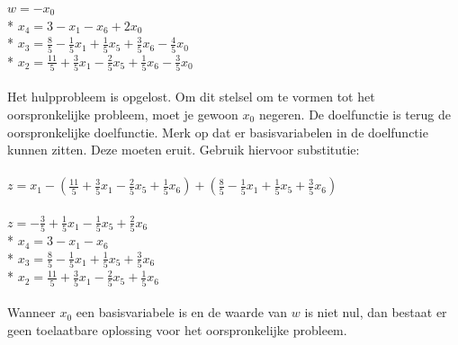 \documentclass[10pt]{article}
\begin{document}
$w = -x_0$\\*
$x_4 = 3 - x_1 - x_6 + 2x_0$\\*
$x_3 = \frac{8}{5} - \frac{1}{5}x_1 + \frac{1}{5}x_5 + \frac{3}{5}x_6 - \frac{4}{5}x_0$\\*
$x_2 = \frac{11}{5} + \frac{3}{5}x_1 - \frac{2}{5}x_5 + \frac{1}{5}x_6 - \frac{3}{5}x_0$\\\\
Het hulpprobleem is opgelost. Om dit stelsel om te vormen tot het oorspronkelijke probleem, moet je gewoon $x_0$ negeren. De doelfunctie is terug de oorspronkelijke doelfunctie. Merk op dat er basisvariabelen in de doelfunctie kunnen zitten. Deze moeten eruit. Gebruik hiervoor substitutie:\\\\
$z = x_1 - (\frac{11}{5} + \frac{3}{5}x_1 - \frac{2}{5}x_5 + \frac{1}{5}x_6) + (\frac{8}{5} - \frac{1}{5}x_1 + \frac{1}{5}x_5 + \frac{3}{5}x_6)$\\\\
$z = -\frac{3}{5} + \frac{1}{5}x_1 - \frac{1}{5}x_5 + \frac{2}{5}x_6$\\*
$x_4 = 3 - x_1 - x_6$\\*
$x_3 = \frac{8}{5} - \frac{1}{5}x_1 + \frac{1}{5}x_5 + \frac{3}{5}x_6$\\*
$x_2 = \frac{11}{5} + \frac{3}{5}x_1 - \frac{2}{5}x_5 + \frac{1}{5}x_6$\\\\
Wanneer $x_0$ een basisvariabele is en de waarde van $w$ is niet nul, dan bestaat er geen toelaatbare oplossing voor het oorspronkelijke probleem.
\end{document}
